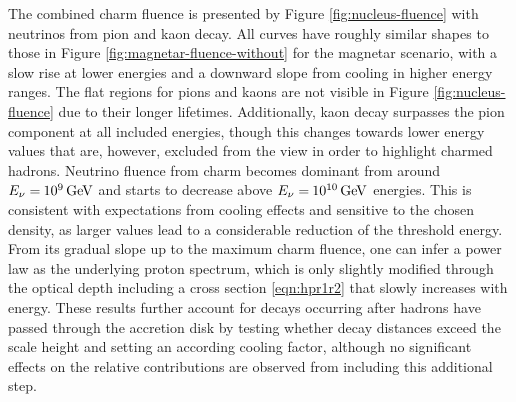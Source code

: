 The combined charm fluence is presented by Figure \ref{fig:nucleus-fluence} with neutrinos from pion and kaon decay. All curves have
roughly similar shapes to those in Figure \ref{fig:magnetar-fluence-without} for the magnetar scenario, with a slow rise at lower
energies and a downward slope from cooling in higher energy ranges. The flat regions for pions and kaons are not visible in Figure
\ref{fig:nucleus-fluence} due to their longer lifetimes. Additionally, kaon decay surpasses the pion component at all included energies,
though this changes towards lower energy values that are, however, excluded from the view in order to highlight charmed hadrons. Neutrino
fluence from charm becomes dominant from around $E_\nu = \kern-0.5pt \qty{e9}{\giga\electronvolt}$ and starts to decrease above
$E_\nu = \kern-0.5pt \qty{e10}{\giga\electronvolt}$ energies. This is consistent with expectations from cooling effects and sensitive
to the chosen density, as larger values lead to a considerable reduction of the threshold energy. From its gradual slope up to the
maximum charm fluence, one can infer a power law as the underlying proton spectrum, which is only slightly modified through the optical
depth including a cross section \eqref{eqn:hpr1r2} that slowly increases with energy. These results further account for decays occurring
after hadrons have passed through the accretion disk by testing whether decay distances exceed the scale height and setting an according
cooling factor, although no significant effects on the relative contributions are observed from including this additional step.

\newpage\null\vfill

\vfill\null\newpage\null\vfill

\vfill\null\newpage
